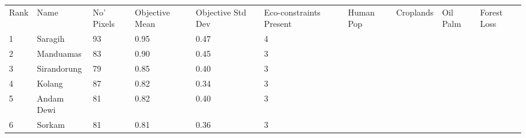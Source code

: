 \begin{table}[ht]
\centering
\begingroup\fontsize{9pt}{10pt}\selectfont
\begin{tabular}{C{0.05\textwidth}C{0.15\textwidth}C{0.08\textwidth}C{0.08\textwidth}C{0.08\textwidth}C{0.08\textwidth}C{0.08\textwidth}C{0.08\textwidth}C{0.08\textwidth}C{0.08\textwidth}}
 Rank & Name & No' Pixels & Objective Mean & Objective Std Dev & Eco-constraints  Present & Human Pop & Croplands & Oil Palm & Forest Loss \\ 
 {1} & Saragih &  93 & \textcolor[HTML]{FFFFFF}{0.95} & \textcolor[HTML]{FFFFFF}{0.47} & \textcolor[HTML]{FFFFFF}{4} &  &  &  &  \\ 
  {2} & Manduamas &  83 & \textcolor[HTML]{FFFFFF}{0.90} & \textcolor[HTML]{FFFFFF}{0.45} & \textcolor[HTML]{000000}{3} &  &  &  &  \\ 
  {3} & Sirandorung &  79 & \textcolor[HTML]{000000}{0.85} & \textcolor[HTML]{000000}{0.40} & \textcolor[HTML]{000000}{3} &  &  &  &  \\ 
  {4} & Kolang &  87 & \textcolor[HTML]{000000}{0.82} & \textcolor[HTML]{000000}{0.34} & \textcolor[HTML]{000000}{3} &  &  &  &  \\ 
  {5} & Andam Dewi &  81 & \textcolor[HTML]{000000}{0.82} & \textcolor[HTML]{000000}{0.40} & \textcolor[HTML]{000000}{3} &  &  &  &  \\ 
  {6} & Sorkam &  81 & \textcolor[HTML]{000000}{0.81} & \textcolor[HTML]{000000}{0.36} & \textcolor[HTML]{000000}{3} &  &  &  &  \\ 

\end{tabular}
\end{table}
